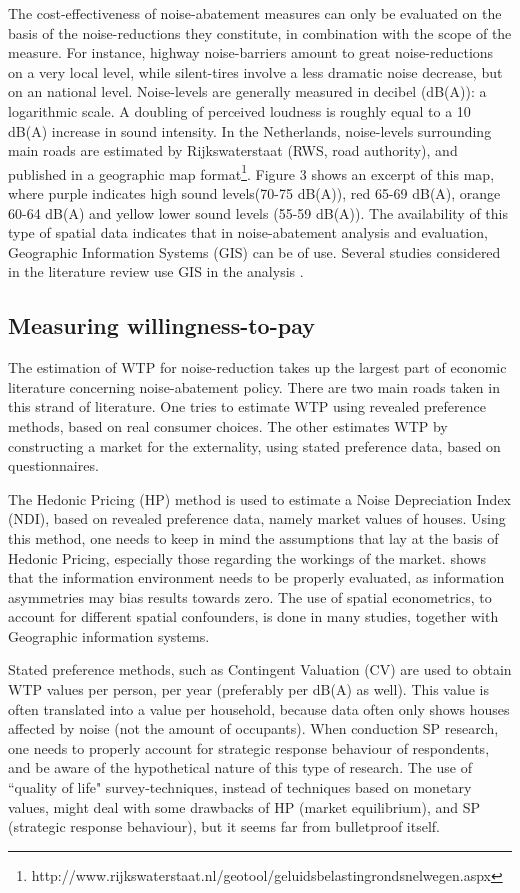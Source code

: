 \documentclass[a4paper]{scrartcl}
\begin{document}
The cost-effectiveness of noise-abatement measures can only be evaluated on the basis of the noise-reductions they constitute, in combination with the scope of the measure. For instance, highway noise-barriers amount to great noise-reductions on a very local level, while silent-tires involve a less dramatic noise decrease, but on an national level. Noise-levels are generally measured  in decibel (dB(A)): a logarithmic scale. A doubling of perceived loudness is roughly equal to a 10 dB(A) increase in sound intensity. In the Netherlands, noise-levels surrounding main roads are estimated by Rijkswaterstaat (RWS, road authority), and published in a geographic map format\footnote{ http://www.rijkswaterstaat.nl/geotool/geluidsbelastingrondsnelwegen.aspx}. Figure 3 shows an excerpt of this map, where purple indicates high sound levels(70-75 dB(A)), red 65-69 dB(A), orange 60-64 dB(A) and yellow lower sound levels (55-59 dB(A)). The availability of this type of spatial data indicates that in noise-abatement analysis and evaluation, Geographic Information Systems (GIS) can be of use. Several studies considered in the literature review use GIS in the analysis \citep{Pope2008, Theebe2004}.

\subsection{Measuring willingness-to-pay}

The estimation of WTP for noise-reduction takes up the largest part of economic literature concerning noise-abatement policy.  There are two main roads taken in this strand of literature. One tries to estimate WTP using revealed preference methods, based on real consumer choices. The other estimates WTP by constructing a market for the externality, using stated preference data, based on questionnaires. 

The Hedonic Pricing (HP) method is used to estimate a Noise Depreciation Index (NDI), based on revealed preference data, namely market values of houses. Using this method, one needs to keep in mind the assumptions that lay at the basis of Hedonic Pricing, especially those regarding the workings of the market. \cite{Pope2008} shows that the information environment needs to be properly evaluated, as information asymmetries may bias results towards zero. The use of spatial econometrics, to account for different spatial confounders, is done in many studies, together with Geographic information systems.

Stated preference methods, such as Contingent Valuation (CV) are used to obtain WTP values per person, per year (preferably per dB(A) as well). This value is often translated into a value per household, because data often only shows houses affected by noise (not the amount of occupants)\citep{Nijland2003}. When conduction SP research, one needs to properly account for strategic response behaviour of respondents, and be aware of the hypothetical nature of this type of research. The use of  ``quality of life" survey-techniques, instead of techniques based on monetary values, might deal with some drawbacks of HP (market equilibrium), and SP (strategic response behaviour), but it seems far from bulletproof itself. 
\end{document}
